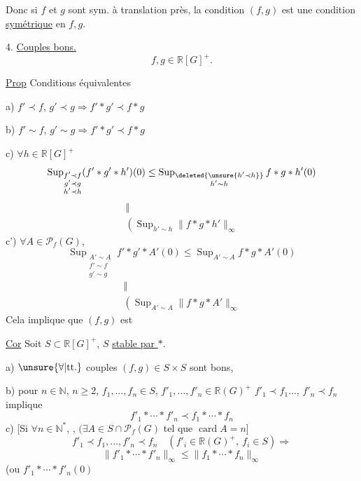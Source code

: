 Donc si $f$ et $g$ sont sym. à translation près, la condition $(f,g)$  est une condition \uline{symétrique} en $f,g$.

4. \uline{Couples bons.}
\[
f,g\in\mathbb R[G]^+.
\]

\uline{Prop} Conditions équivalentes

a) $f'\prec f$, $g'\prec g\Longrightarrow f'\ast g'\prec f\ast g$

b) $f'\sim f$, $g'\sim g\Longrightarrow f'\ast g'\prec f\ast g$

c) $\forall h\in\mathbb R[G]^+$
\[
\operatorname{Sup}_{\substack{f'\prec f\\g'\prec g\\h'\prec h}}
(f'\ast g'\ast h')(0)
\leq\operatorname{Sup}_{\substack{\deleted{\unsure{h'\prec h}}\\h'\sim h}}f\ast g\ast h'(0)
\]
\[
\begin{gathered}\Vert\\\left(\operatorname{Sup}_{h'\sim h}\|f\ast g\ast h'\|_\infty\right.\end{gathered}
\]
c') $\forall A\in\mathcal P_f(G)$,
\[
\operatorname{Sup}_{\substack{A'\sim A\\f'\sim f\\g'\sim g}}f'\ast g'\ast A'(0)
\leq\operatorname{Sup}_{A'\sim A}f\ast g\ast A'(0)
\]
\[
\begin{gathered}\Vert\\\left(\operatorname{Sup}_{A'\sim A}\|f\ast g\ast A'\|_\infty\right.\end{gathered}
\]
Cela implique que $(f,g)$ est \uline{}

\uline{Cor} Soit $S\subset\mathbb R[G]^+$, $S$ \uline{stable par $\ast$}.

 a) $\unsure{\forall|\text{tt.}}$ couples $(f,g)\in S\times S$ sont bons, 

b)  pour  $n\in\mathbb N$, $n\geq2$, $f_1,\ldots,f_n\in S$, $f'_1,\ldots,f'_n\in\mathbb R(G)^+$
$f'_1\prec f_1\ldots$, $f'_n\prec f_n$ implique
\[
f'_1\ast\cdots\ast f'_n\prec f_1\ast\cdots\ast f_n
\]
c) [Si $\forall n\in\mathbb N^\ast$, , $(\exists A\in S\cap\mathcal P_f(G)$ tel que $\operatorname{card}A=n$]
\[
f'_1\prec f_1,\ldots,f'_n\prec f_n\quad(f'_i\in\mathbb R(G)^+,\ f_i\in S)\Longrightarrow
\]
\[
\|f'_1\ast\cdots\ast f'_n\|_\infty\leq\|f_1\ast\cdots\ast f_n\|_\infty
\]
(ou $f'_1\ast\cdots\ast f'_n(0)$


